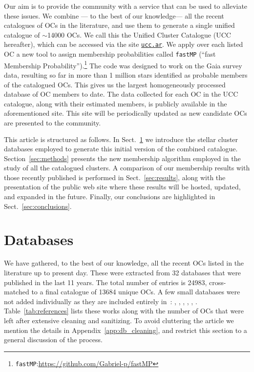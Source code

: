 \documentclass[fleqn,usenatbib]{mnras}
\begin{document}
Our aim is to provide the community with a service that can be used to
alleviate these issues. We combine --- to the best of our knowledge--- all the
recent catalogues of OCs in the literature, and use them to generate a single
unified catalogue of $\sim$14000 OCs. We call this the Unified Cluster Catalogue
(UCC hereafter), which can be accessed via the site
\href{https://ucc.ar/}{\texttt{ucc.ar}}.
We apply over each listed OC a new tool
to assign membership probabilities called \texttt{fastMP} (``fast Membership
Probability'').\footnote{\texttt{fastMP}:\url{https://github.com/Gabriel-p/fastMP}}
The code was designed to work on the Gaia survey data, resulting
so far in more than 1 million stars identified as probable members of the
catalogued OCs. This gives us the largest homogeneously processed
database of OC members to date. The data collected for each OC in the UCC
catalogue, along with their estimated members, is publicly available in the
aforementioned site. This site will be periodically updated as new candidate OCs
are presented to the community.

This article is structured as follows. In Sect.~\ref{sec:databases} we
introduce the stellar cluster databases employed to generate this initial
version of the combined catalogue. Section~\ref{sec:methods} presents the
new membership algorithm employed in the study of all the catalogued clusters.
A comparison of our membership results with those recently published is
performed in Sect.~\ref{sec:results}, along with the presentation of the public
web site where these results will be hosted, updated, and expanded in the future.
Finally, our conclusions are highlighted in Sect.~\ref{sec:conclusions}.


\section{Databases}
\label{sec:databases}

We have gathered, to the best of our knowledge, all the recent OCs listed in
the literature up to present day. These were extracted from 32 databases that
were published in the last 11 years. The total number of entries is 24983,
cross-matched to a final catalogue of 13684 unique OCs.
A few small databases were not added individually as they are included entirely
in~\cite{Hunt_2023}: \cite{Zari_2018}, \cite{Bastian_2019}, \cite{Tian_2020}, 
\cite{Qin_2021}, \cite{Anders_2022}, \cite{Casado_2023}.
%
Table~\ref{tab:references} lists these works along with the number of OCs
that were left after extensive cleaning and sanitizing. To avoid cluttering the
article we mention the details in Appendix~\ref{app:db_cleaning}, and restrict
this section to a general discussion of the process.
\end{document}
